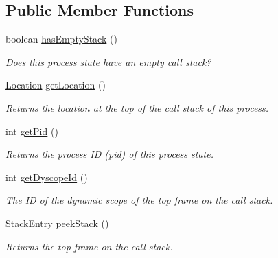 \subsection*{Public Member Functions}
\begin{DoxyCompactItemize}
\item 
boolean \hyperlink{interfaceedu_1_1udel_1_1cis_1_1vsl_1_1civl_1_1state_1_1IF_1_1ProcessState_ac360e552f70fe4a6abbf3ed467692e1f}{has\+Empty\+Stack} ()
\begin{DoxyCompactList}\small\item\em Does this process state have an empty call stack? \end{DoxyCompactList}\item 
\hyperlink{interfaceedu_1_1udel_1_1cis_1_1vsl_1_1civl_1_1model_1_1IF_1_1location_1_1Location}{Location} \hyperlink{interfaceedu_1_1udel_1_1cis_1_1vsl_1_1civl_1_1state_1_1IF_1_1ProcessState_a9a7f310c24d43dcebfb0b0dd980bcebc}{get\+Location} ()
\begin{DoxyCompactList}\small\item\em Returns the location at the top of the call stack of this process. \end{DoxyCompactList}\item 
int \hyperlink{interfaceedu_1_1udel_1_1cis_1_1vsl_1_1civl_1_1state_1_1IF_1_1ProcessState_af1d278c69916d774e259736b96fa165d}{get\+Pid} ()
\begin{DoxyCompactList}\small\item\em Returns the process I\+D (pid) of this process state. \end{DoxyCompactList}\item 
int \hyperlink{interfaceedu_1_1udel_1_1cis_1_1vsl_1_1civl_1_1state_1_1IF_1_1ProcessState_a2bd0a161aafb230460ffc430ce4b830d}{get\+Dyscope\+Id} ()
\begin{DoxyCompactList}\small\item\em The I\+D of the dynamic scope of the top frame on the call stack. \end{DoxyCompactList}\item 
\hyperlink{interfaceedu_1_1udel_1_1cis_1_1vsl_1_1civl_1_1state_1_1IF_1_1StackEntry}{Stack\+Entry} \hyperlink{interfaceedu_1_1udel_1_1cis_1_1vsl_1_1civl_1_1state_1_1IF_1_1ProcessState_a2f92564072e4f205fb2eeeca62af4bad}{peek\+Stack} ()
\begin{DoxyCompactList}\small\item\em Returns the top frame on the call stack. \end{DoxyCompactList}\item 

\end{DoxyCompactItemize}

